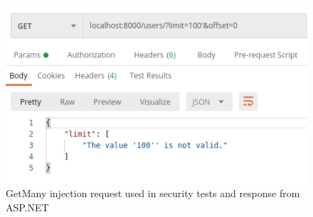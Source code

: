 \begin{figure}[H]
    \centering
    \includegraphics[width=0.7\columnwidth]{figures/pictures/getManyInjectionRequest.jpg}
    \caption{GetMany injection request used in security tests and response from ASP.NET}
    \label{fig:getManyInjectionRequest}
\end{figure}
